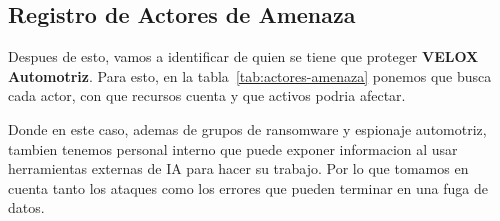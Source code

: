 \documentclass[letterpaper,11pt]{article}
\begin{document}
\subsection{Registro de Actores de Amenaza}

Despues de esto, vamos a identificar de quien se tiene que proteger
\textbf{VELOX Automotriz}. Para esto, en la
tabla~\ref{tab:actores-amenaza} ponemos que busca cada actor, con que
recursos cuenta y que activos podria afectar.

Donde en este caso, ademas de grupos de ransomware y espionaje
automotriz, tambien tenemos personal interno que puede exponer
informacion al usar herramientas externas de IA para hacer su
trabajo. Por lo que tomamos en cuenta tanto los ataques como los
errores que pueden terminar en una fuga de datos.
\end{document}
